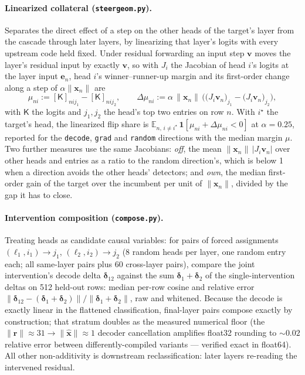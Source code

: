 \paragraph{Linearized collateral (\texttt{steergeom.py}).}
Separates the direct effect of a step on the other heads of the target's
layer from the cascade through later layers, by linearizing that layer's
logits with every upstream code held fixed. Under residual forwarding an
input step $\mathbf{v}$ moves the layer's residual input by exactly
$\mathbf{v}$, so with $J_i$ the Jacobian of head $i$'s logits at the
layer input $\mathbf{e}_n$, head $i$'s winner--runner-up margin and its
first-order change along a step of $\alpha\lVert\mathbf{x}_n\rVert$ are
\begin{equation}
	\mu_{ni} := [\mathsf{K}]_{nij_1} - [\mathsf{K}]_{nij_2},
	\qquad
	\Delta\mu_{ni} := \alpha\,\lVert\mathbf{x}_n\rVert\,
	\Big(\big(J_i\mathbf{v}_n\big)_{j_1} - \big(J_i\mathbf{v}_n\big)_{j_2}\Big),
	\label{eq:flip}
\end{equation}
with $\mathsf{K}$ the logits and $j_1, j_2$ the head's top two entries on
row $n$. With $i^\star$ the target's head, the linearized flip share is
$\mathbb{E}_{n,\,i \neq i^\star}\,\mathbf{1}[\mu_{ni} + \Delta\mu_{ni} <
0]$ at $\alpha{=}0.25$, reported for the \texttt{decode},
\texttt{grad} and \texttt{random} directions with the median margin $\mu$.
Two further measures use the same Jacobians: \emph{off}, the mean
$\lVert\mathbf{x}_n\rVert\,\lvert J_i\mathbf{v}_n\rvert$ over other heads
and entries as a ratio to the random direction's, which is below 1 when a
direction avoids the other heads' detectors; and \emph{own}, the median
first-order gain of the target over the incumbent per unit of
$\lVert\mathbf{x}_n\rVert$, divided by the gap it has to close.

\paragraph{Intervention composition (\texttt{compose.py}).}
Treating heads as candidate causal variables: for pairs of forced
assignments $(\ell_1,i_1){\to}j_1$, $(\ell_2,i_2){\to}j_2$ (8 random heads
per layer, one random entry each; all same-layer pairs plus 60 cross-layer
pairs), compare the joint intervention's decode delta
$\boldsymbol{\delta}_{12}$ against the sum
$\boldsymbol{\delta}_1{+}\boldsymbol{\delta}_2$ of the single-intervention
deltas on 512 held-out rows: median per-row cosine and relative error
$\lVert\boldsymbol{\delta}_{12}-(\boldsymbol{\delta}_1{+}\boldsymbol{\delta}_2)\rVert
/\lVert\boldsymbol{\delta}_1{+}\boldsymbol{\delta}_2\rVert$, raw and
whitened. Because the
decode is exactly linear in the flattened classification, final-layer
pairs compose exactly by construction; that stratum doubles as the
measured numerical floor (the $\lVert\mathbf{r}\rVert{\approx}31 \to
\lVert\hat{\mathbf{x}}\rVert{\approx}1$
decoder cancellation amplifies float32 rounding to ${\sim}0.02$ relative
error between differently-compiled variants --- verified exact in
float64). All other non-additivity is downstream reclassification:
later layers re-reading the intervened residual.

